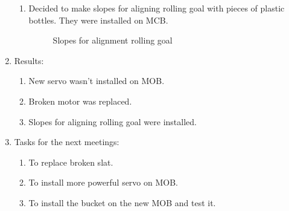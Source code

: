 \begin{enumerate}
\begin{enumerate}
	  \item Decided to make slopes for aligning rolling goal with pieces of plastic bottles. They were installed on MCB. 
      \begin{figure}[H]
      	\begin{minipage}[h]{1\linewidth}
      		\caption{Slopes for alignment rolling goal}
      	\end{minipage}
      \end{figure}	
      
 	\end{enumerate}
 	\item Results:
 	\begin{enumerate}
 		
 		\item New servo wasn't installed on MOB.
 		
 		\item Broken motor was replaced.
 		
 		\item Slopes for aligning rolling goal were installed.
 		 
 	\end{enumerate}
 	\item Tasks for the next meetings:
 	\begin{enumerate}
 		
 		\item To replace broken slat.
 		
 		\item To install more powerful servo on MOB.
 		
 		\item To install the bucket on the new MOB and test it.
 				
 	\end{enumerate}
\end{enumerate}
\fillpage
